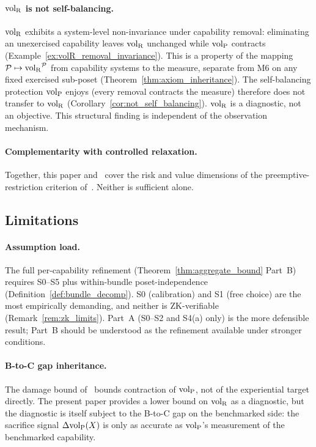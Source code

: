 \paragraph{${\operatorname{vol}_{\mathrm{R}}}$ is not self-balancing.}
${\operatorname{vol}_{\mathrm{R}}}$ exhibits a system-level non-invariance under capability
removal: eliminating an unexercised capability leaves ${\operatorname{vol}_{\mathrm{R}}}$
unchanged while ${\operatorname{vol}_{\mathrm{P}}}$ contracts
(Example~\ref{ex:volR_removal_invariance}).  This is a property
of the mapping $\mathcal{P} \mapsto {\operatorname{vol}_{\mathrm{R}}}^{\mathcal{P}}$ from
capability systems to the measure, separate from M6 on any
fixed exercised sub-poset
(Theorem~\ref{thm:axiom_inheritance}).  The self-balancing
protection ${\operatorname{vol}_{\mathrm{P}}}$ enjoys (every removal contracts the
measure) therefore does not transfer to ${\operatorname{vol}_{\mathrm{R}}}$
(Corollary~\ref{cor:not_self_balancing}).  ${\operatorname{vol}_{\mathrm{R}}}$ is a
diagnostic, not an objective.  This structural finding is
independent of the observation mechanism.

\paragraph{Complementarity with controlled relaxation.}
Together, this paper and~\citep[Controlled~Relaxation]{lasser2026wamura} cover the
risk and value dimensions of the
preemptive-restriction criterion of~\citep[Proposition~1]{lasser2026horizon}.
Neither is sufficient alone.

\subsection{Limitations}

\paragraph{Assumption load.}
The full per-capability refinement
(Theorem~\ref{thm:aggregate_bound} Part~B) requires S0--S5 plus
within-bundle poset-independence
(Definition~\ref{def:bundle_decomp}).  S0 (calibration) and S1
(free choice) are the most empirically demanding, and neither
is ZK-verifiable (Remark~\ref{rem:zk_limits}).  Part~A (S0--S2
and S4(a) only) is the more defensible result; Part~B should be
understood as the refinement available under stronger
conditions.

\paragraph{B-to-C gap inheritance.}
The damage bound of~\citep[Theorem~1]{lasser2026wamura} bounds
contraction of ${\operatorname{vol}_{\mathrm{P}}}$, not of the experiential target
directly.  The present paper provides a lower bound on ${\operatorname{vol}_{\mathrm{R}}}$
as a diagnostic, but the diagnostic is itself subject to the
B-to-C gap on the benchmarked side: the sacrifice signal
$\Delta{\operatorname{vol}_{\mathrm{P}}}(X)$ is only as accurate as ${\operatorname{vol}_{\mathrm{P}}}$'s measurement
of the benchmarked capability.

